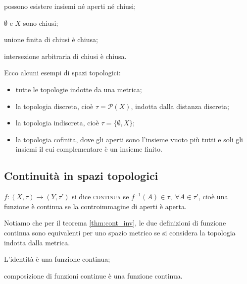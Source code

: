 \documentclass{article}
\begin{document}
\begin{oss}
\begin{nlist}
\item possono esistere insiemi né aperti né chiusi;
\item $\emptyset$ e $X$ sono chiusi;
\item unione finita di chiusi è chiusa;
\item intersezione arbitraria di chiusi è chiusa.
\end{nlist}
\end{oss}

\begin{ex}
Ecco alcuni esempi di spazi topologici:
\begin{itemize}
\item tutte le topologie indotte da una metrica;
\item la topologia discreta, cioè $\tau=\mathcal{P}(X)$, indotta dalla distanza
discreta;
\item la topologia indiscreta, cioè $\tau=\{ \emptyset, X \}$;
\item la topologia cofinita, dove gli aperti sono l'insieme vuoto più tutti e
soli gli insiemi il cui complementare è un insieme finito.
\end{itemize}
\end{ex}

\subsection{Continuità in spazi topologici}

\begin{defn}
$f: (X, \tau) \rightarrow (Y, \tau')$ si dice \textsc{continua} se ${f^{-1}(A)
\in \tau,}\; {\forall A \in \tau'}$, cioè una funzione \`e continua se la
controimmagine di aperti \`e aperta.
\end{defn}

Notiamo che per il teorema \ref{thm:cont_inv}, le due
definizioni di funzione continua sono equivalenti per uno spazio metrico se si
considera la topologia indotta dalla metrica.

\begin{thm}
\begin{nlist}
\item L'identità è una funzione continua;
\item composizione di funzioni continue è una funzione continua.
\end{nlist}
\end{thm}
\end{document}
